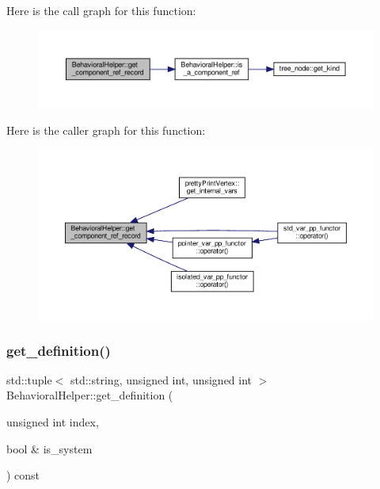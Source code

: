 Here is the call graph for this function\+:
\nopagebreak
\begin{figure}[H]
\begin{center}
\leavevmode
\includegraphics[width=350pt]{dd/db2/classBehavioralHelper_ab21921c77ebb4ed124d6059ad69cb523_cgraph}
\end{center}
\end{figure}
Here is the caller graph for this function\+:
\nopagebreak
\begin{figure}[H]
\begin{center}
\leavevmode
\includegraphics[width=350pt]{dd/db2/classBehavioralHelper_ab21921c77ebb4ed124d6059ad69cb523_icgraph}
\end{center}
\end{figure}
\mbox{\label{classBehavioralHelper_a3cc24dd0e8e6e4e37fe28f18f73407bd}} 
\subsubsection{\texorpdfstring{get\+\_\+definition()}{get\_definition()}}
{\footnotesize\ttfamily std\+::tuple$<$ std\+::string, unsigned int, unsigned int $>$ Behavioral\+Helper\+::get\+\_\+definition (\begin{DoxyParamCaption}\item[{unsigned int}]{index,  }\item[{bool \&}]{is\+\_\+system }\end{DoxyParamCaption}) const\hspace{0.3cm}{\ttfamily [virtual]}}



